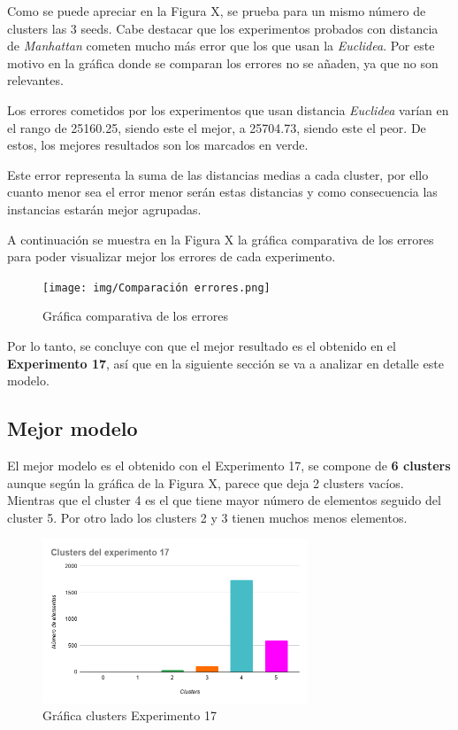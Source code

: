 \documentclass[12pt,a4paper, xcolor=table]{article}
\begin{document}
Como se puede apreciar en la Figura X, se prueba para un mismo número de clusters las 3 seeds. Cabe destacar que los experimentos probados con distancia de \textit{Manhattan} cometen mucho más error que los que usan la \textit{Euclidea}. Por este motivo en la gráfica donde se comparan los errores no se añaden, ya que no son relevantes.

\vspace{2mm}

Los errores cometidos por los experimentos que usan distancia \textit{Euclidea} varían en el rango de 25160.25, siendo este el mejor, a 25704.73, siendo este el peor. De estos, los mejores resultados son los marcados en verde.

\vspace{2mm}

Este error representa la suma de las distancias medias a cada cluster, por ello cuanto menor sea el error menor serán estas distancias y como consecuencia las instancias estarán mejor agrupadas.

\vspace{3mm}


A continuación se muestra en la Figura X la gráfica comparativa de los errores para poder visualizar mejor los errores de cada experimento.

\begin{figure}[h]
    \centering
    \texttt{[image: img/Comparación errores.png]}
    \caption{Gráfica comparativa de los errores}
    \label{fig:graf_exp1}
\end{figure}

Por lo tanto, se concluye con que el mejor resultado es el obtenido en el \textbf{Experimento 17}, así que en la siguiente sección se va a analizar en detalle este modelo.

\newpage


\subsection{Mejor modelo}

El mejor modelo es el obtenido con el Experimento 17, se compone de \textbf{6 clusters} aunque según la gráfica de la Figura X, parece que deja 2 clusters vacíos. Mientras que el cluster 4 es el que tiene mayor número de elementos seguido del cluster 5. Por otro lado los clusters 2 y 3 tienen muchos menos elementos.

\begin{figure}[h]
    \centering
    \includegraphics[width=300px]{img/clusters_del_experimento_17.png}
    \caption{Gráfica clusters Experimento 17}
    \label{fig:graf_exp1}
\end{figure}
\end{document}
